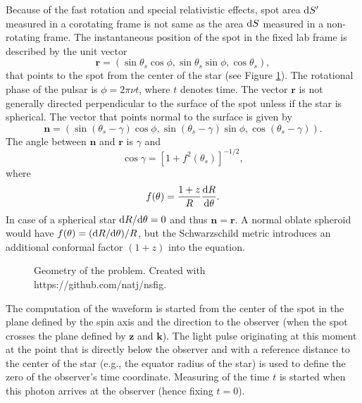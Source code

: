 \documentclass{wihuri}
\def\be{\begin{equation}}
\def\ee{\end{equation}}
\def\d{{\rm d}}
\def\thetas{\theta_{s}}
\newcommand{\bmath}[1]{\boldsymbol{#1}}
\begin{document}
Because of the fast rotation and special relativistic effects, spot area $\d S^\prime$ measured in a corotating frame is not same as the area $\d S$ measured in a non-rotating frame. The instantaneous position of the spot in the fixed lab frame is described by the unit vector 
\begin{equation}
\bmath{r}=(\sin\thetas\cos\phi, \sin\thetas\sin\phi, \cos\thetas),
\end{equation}
that points to the spot from the center of the star (see Figure \ref{fig:geom2}). The rotational phase of the pulsar is $\phi=2\pi\nu t$, where $t$ denotes time. The vector $\bmath{r}$ is not generally directed perpendicular to the surface of the spot unless if the star is spherical. The vector that points normal to the surface is given by
\begin{equation}
\bmath{n}=(\sin(\thetas-\gamma)\cos\phi, \sin(\thetas-\gamma)\sin\phi, \cos(\thetas-\gamma)).
\end{equation}
The angle between $\bmath{n}$ and $\bmath{r}$ is $\gamma$ and 
\begin{equation}
\cos\gamma=[1+f^{2}(\thetas)]^{-1/2},
\end{equation}
where
\be \label{eq:ftheta}
f(\theta)=\frac{1+z}{R}\frac{\d R}{\d \theta}.
\ee
In case of a spherical star $\d R / \d \theta = 0$ and thus $\bmath{n} = \bmath{r}$. A normal oblate spheroid would have $f(\theta)=(\d R /\d \theta)/R$, but the Schwarzschild metric introduces an additional conformal factor $(1+z)$ into the equation. 

\begin{figure}
\centerline{}
\caption{Geometry of the problem. Created with https://github.com/natj/nsfig. %
\label{fig:geom2}}
\end{figure}



The computation of the waveform is started from the center of the spot in the plane defined by the spin axis and the direction to the observer 
(when the spot crosses the plane defined by $\bmath{z}$ and $\bmath{k}$). The light pulse originating at this moment at the point that is directly below the observer and with a reference distance to the center of the star (e.g., the equator radius of the star) is used to define the zero of the observer's time coordinate. Measuring of the time $t$ is started when this photon arrives at the observer (hence fixing $t=0$). %
\end{document}
